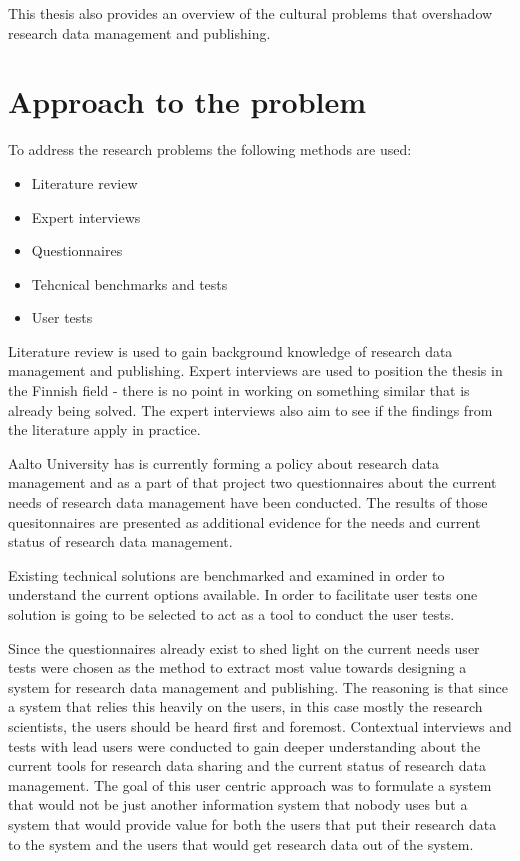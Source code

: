 This thesis also provides an overview of the cultural problems that overshadow
research data management and publishing.

\section{Approach to the problem}

To address the research problems the following methods are used:

\begin{itemize}
    \item Literature review
    \item Expert interviews
    \item Questionnaires
    \item Tehcnical benchmarks and tests
    \item User tests
\end{itemize}

Literature review is used to gain background knowledge of research data
management and publishing. Expert interviews are used to position the thesis
in the Finnish field - there is no point in working on something similar that
is already being solved. The expert interviews also aim to see if the findings
from the literature apply in practice.

Aalto University has is currently forming a policy about research data
management and as a part of that project two questionnaires about the
current needs of research data management have been conducted. The results of
those quesitonnaires are presented as additional evidence for the needs and
current status of research data management.

Existing technical solutions are benchmarked and examined in order to
understand the current options available. In order to facilitate user tests
one solution is going to be selected to act as a tool to conduct the user
tests.

Since the questionnaires already exist to shed light on the current needs user
tests were chosen as the method to extract most value towards designing a
system for research data management and publishing. The reasoning is that since
a system that relies this heavily on the users, in this case mostly the
research scientists, the users should be heard first and foremost. Contextual
interviews and tests with lead users were conducted to gain deeper
understanding about the current tools for research data sharing and the current
status of research data management. The goal of this user centric approach was
to formulate a system that would not be just another information system that
nobody uses but a system that would provide value for both the users that
put their research data to the system and the users that would get research
data out of the system.

